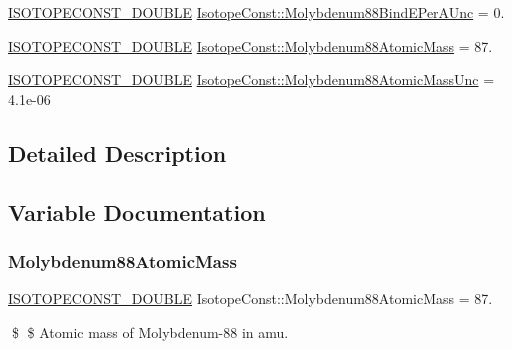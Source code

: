 \begin{DoxyCompactItemize}
\mbox{\hyperlink{group___isotope_const-_macros_ga8f45a7272ce02c0b4c65c44636ed719a}{I\+S\+O\+T\+O\+P\+E\+C\+O\+N\+S\+T\+\_\+\+D\+O\+U\+B\+LE}} \mbox{\hyperlink{group___isotope_const-_molybdenum-_mo88_ga97657a59844190ab0450a17945cfdcf8}{Isotope\+Const\+::\+Molybdenum88\+Bind\+E\+Per\+A\+Unc}} = 0.
\item 
\mbox{\hyperlink{group___isotope_const-_macros_ga8f45a7272ce02c0b4c65c44636ed719a}{I\+S\+O\+T\+O\+P\+E\+C\+O\+N\+S\+T\+\_\+\+D\+O\+U\+B\+LE}} \mbox{\hyperlink{group___isotope_const-_molybdenum-_mo88_ga5535579ba21604cc7802895ead176a1b}{Isotope\+Const\+::\+Molybdenum88\+Atomic\+Mass}} = 87.
\item 
\mbox{\hyperlink{group___isotope_const-_macros_ga8f45a7272ce02c0b4c65c44636ed719a}{I\+S\+O\+T\+O\+P\+E\+C\+O\+N\+S\+T\+\_\+\+D\+O\+U\+B\+LE}} \mbox{\hyperlink{group___isotope_const-_molybdenum-_mo88_ga20e7dc090834ab074067ca74fc96d4b8}{Isotope\+Const\+::\+Molybdenum88\+Atomic\+Mass\+Unc}} = 4.\+1e-\/06
\end{DoxyCompactItemize}


\subsection{Detailed Description}


\subsection{Variable Documentation}
\mbox{\label{group___isotope_const-_molybdenum-_mo88_ga5535579ba21604cc7802895ead176a1b}} 
\subsubsection{\texorpdfstring{Molybdenum88\+Atomic\+Mass}{Molybdenum88AtomicMass}}
{\footnotesize\ttfamily \mbox{\hyperlink{group___isotope_const-_macros_ga8f45a7272ce02c0b4c65c44636ed719a}{I\+S\+O\+T\+O\+P\+E\+C\+O\+N\+S\+T\+\_\+\+D\+O\+U\+B\+LE}} Isotope\+Const\+::\+Molybdenum88\+Atomic\+Mass = 87.}

\$ \$ Atomic mass of Molybdenum-\/88 in amu. \mbox{\label{group___isotope_const-_molybdenum-_mo88_ga20e7dc090834ab074067ca74fc96d4b8}} 
